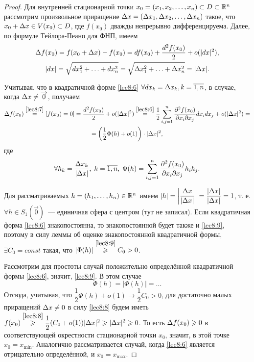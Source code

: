 \documentclass[../../main.tex]{subfiles}
\begin{document}
\begin{proof}
Для внутренней стационарной точки $x_0 = (x_1, x_2, \ldots, x_n) \subset D 
\subset \R^n$ рассмотрим произвольное приращение $\D x = (\D x_1, \D x_2, 
\ldots, \D x_n)$ такое, что $x_0 + \D x \in V(x_0) \subset D$, где $f(x_0)$ 
дважды непрерывно дифференцируема. Далее, по формуле Тейлора-Пеано для ФНП, 
имеем
\begin{equation}
\begin{gathered}
\D f(x_0) = f(x_0 + \D x) - f(x_0) = df(x_0) + \frac{d^2f(x_0)}2 + o(|dx|^2), 
\\|dx| = \sqrt{dx_1^2 + \ldots + dx_n^2} = \sqrt{\D x_1^2 + \ldots + \D x_n^2} 
= |\D x|.
\end{gathered}
\label{lec8:7}
\end{equation}

Учитывая, что в квадратичной форме \eqref{lec8:6} $\forall dx_k = \D 
x_k, k = \overline{1, n}$, в случае, когда $\D x \ne \overrightarrow{0}$,
 получаем 
\begin{equation}
\begin{gathered}
\D f(x_0) \stackrel{\eqref{lec8:7}}{=} [f(x_0) = 0] = \frac{d^2f(x_0)}2 + 
o(|\D x|^2) \stackrel{\eqref{lec8:6}}{=} \frac12 
\sum_{i, j = 1}^n\pderiv{^2f(x_0)}{x_i\partial x_j}dx_idx_j 
+ o(|\D x|^2) = \\ =\left(\frac12 \Phi(h) + o(1) \right) \cdot |\D x|^2,
\end{gathered}
\label{lec8:8}
\end{equation}
где
\begin{equation}
\forall h_k = \frac{\D x_k}{|\D x|}, \; k = \overline{1,n}, \; \Phi(h)
 = \sum_{i, j = 1}^n\pderiv{^2f(x_0)}{x_i\partial x_j}h_ih_j. 
\label{lec8:9}
\end{equation}

Для рассматриваемых $h = (h_1, \ldots, h_n) \in \R^n$ имеем 
$|h| = \left|\dfrac{\D x}{|\D x|}\right| = \dfrac{|\D x|}{|\D x|} = 1$, 
т. е. $\forall h \in S_1(\overrightarrow{0})$~--- единичная сфера с 
центром (тут не записал). Если квадратичная форма \eqref{lec8:6} знакопостоянна,
то знакопостоянной будет также и \eqref{lec8:9}, поэтому в силу леммы об оценке
знакопостоянной квадратичной формы, $\exists C_0 = const$ такая, что $|\Phi(h)|
\stackrel{\eqref{lec8:9}}{\geq} C_0 > 0$.

Рассмотрим для простоты случай положительно определённой квадратичной формы 
\eqref{lec8:6}, значит, \eqref{lec8:9}. В этом случае 
\[\Phi(h) = |\Phi(h)| = ...\]
Отсюда, учитывая, что $\dfrac12 \Phi(h) + o(1) \to \dfrac12C_0 > 0$, для 
достаточно малых приращений $\D x \ne 0$ в силу \eqref{lec8:8} будем иметь 
$f(x_0) \stackrel{\eqref{lec8:8}}{\geq} \dfrac12 (C_0 + o(1)) |\D x|^2 \geq 
|\D x|^2 \geq 0$. То есть $\D f(x_0) \geq 0$ в соответствующей окрестности
стационарной точки $x_0$, значит, в этой точке $x_0 = x_{\min}$. Аналогично
рассматривается случай, когда \eqref{lec8:6} является отрицательно 
определённой, и $x_0 = x_{\max}$. 
\end{proof}
\end{document}
